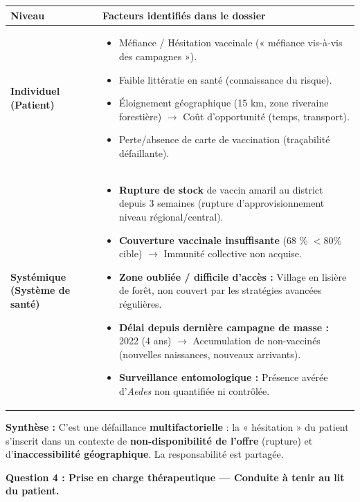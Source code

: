 \documentclass[11pt]{article}
\begin{document}
\begin{exoresolu}
\begin{center}
\begin{tabularx}{\linewidth}{|l|X|}\hline
\textbf{Niveau} & \textbf{Facteurs identifiés dans le dossier} \\ \hline
\textbf{Individuel (Patient)} & \begin{itemize}\item Méfiance / Hésitation vaccinale (« méfiance vis-à-vis des campagnes »).
\item Faible littératie en santé (connaissance du risque).
\item Éloignement géographique (15 km, zone riveraine forestière) $\rightarrow$ Coût d'opportunité (temps, transport).
\item Perte/absence de carte de vaccination (traçabilité défaillante).
\end{itemize} \\ \hline
\textbf{Systémique (Système de santé)} & \begin{itemize}
\item \textbf{Rupture de stock} de vaccin amaril au district depuis 3 semaines (rupture d'approvisionnement niveau régional/central).
\item \textbf{Couverture vaccinale insuffisante} (68 \% $< 80 \%$ cible) $\rightarrow$ Immunité collective non acquise.
\item \textbf{Zone oubliée / difficile d'accès :} Village en lisière de forêt, non couvert par les stratégies avancées régulières.
\item \textbf{Délai depuis dernière campagne de masse :} 2022 (4 ans) $\rightarrow$ Accumulation de non-vaccinés (nouvelles naissances, nouveaux arrivants).
\item \textbf{Surveillance entomologique :} Présence avérée d'\emph{Aedes} non quantifiée ni contrôlée.
\end{itemize} \\ \hline
\end{tabularx}
\end{center}
\textbf{Synthèse :} C'est une défaillance \textbf{multifactorielle} : la « hésitation » du patient s'inscrit dans un contexte de \textbf{non-disponibilité de l'offre} (rupture) et d'\textbf{inaccessibilité géographique}. La responsabilité est partagée.

\textbf{Question 4 : Prise en charge thérapeutique — Conduite à tenir au lit du patient.}


\end{exoresolu}
\end{document}
